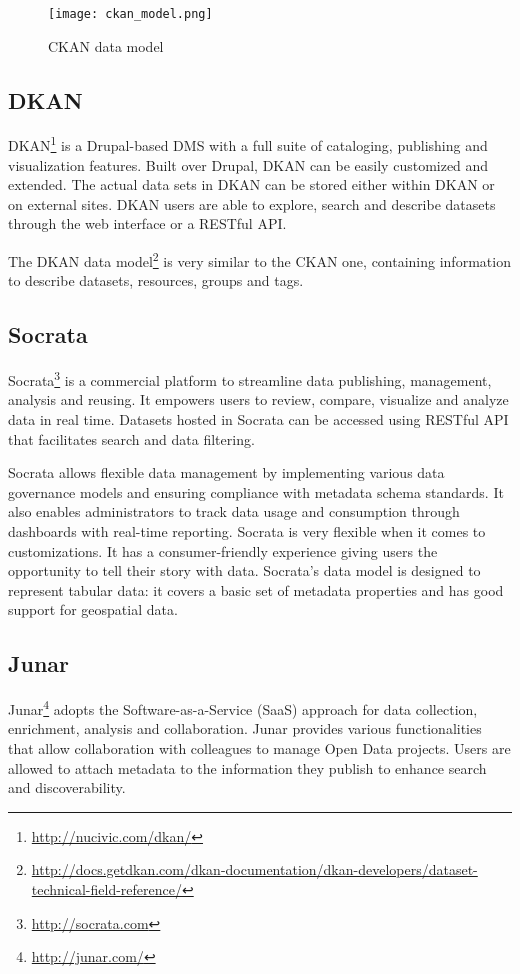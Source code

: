 \begin{figure}[ht!]
\centering
	\texttt{[image: ckan\_model.png]}
	\caption{CKAN data model}
	\label{fig:ckan_model}
\end{figure}

\subsection{DKAN}
DKAN\footnote{\url{http://nucivic.com/dkan/}} is a Drupal-based DMS with a full suite of cataloging, publishing and visualization features. Built over Drupal, DKAN can be easily customized and extended. The actual data sets in DKAN can be stored either within DKAN or on external sites. DKAN users are able to explore, search and describe datasets through the web interface or a RESTful API.

The DKAN data model\footnote{\url{http://docs.getdkan.com/dkan-documentation/dkan-developers/dataset-technical-field-reference/}} is very similar to the CKAN one, containing information to describe datasets, resources, groups and tags.

\subsection{Socrata}
Socrata\footnote{\url{http://socrata.com}} is a commercial platform to streamline data publishing, management, analysis and reusing. It empowers users to review, compare, visualize and analyze data in real time. Datasets hosted in Socrata can be accessed using RESTful API that facilitates search and data filtering.

Socrata allows flexible data management by implementing various data governance models and ensuring compliance with metadata schema standards. It also enables administrators to track data usage and consumption through dashboards with real-time reporting. Socrata is very flexible when it comes to customizations. It has a consumer-friendly experience giving users the opportunity to tell their story with data. Socrata's data model is designed to represent tabular data: it covers a basic set of metadata properties and has good support for geospatial data.

\subsection{Junar}
Junar\footnote{\url{http://junar.com/}} adopts the Software-as-a-Service (SaaS) approach for data collection, enrichment, analysis and collaboration. Junar provides various functionalities that allow collaboration with colleagues to manage Open Data projects. Users are allowed to attach metadata to the information they publish to enhance search and discoverability.

